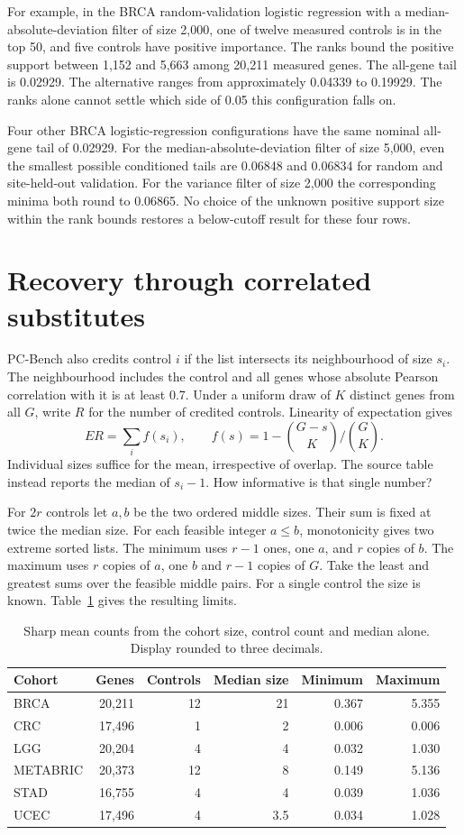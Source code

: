\documentclass[11pt]{article}
\begin{document}
For example, in the BRCA random-validation logistic regression with a median-absolute-deviation filter of size 2,000, one of twelve measured controls is in the top 50, and five controls have positive importance. The ranks bound the positive support between 1,152 and 5,663 among 20,211 measured genes. The all-gene tail is 0.02929. The alternative ranges from approximately 0.04339 to 0.19929. The ranks alone cannot settle which side of 0.05 this configuration falls on.

Four other BRCA logistic-regression configurations have the same nominal all-gene tail of 0.02929. For the median-absolute-deviation filter of size 5,000, even the smallest possible conditioned tails are 0.06848 and 0.06834 for random and site-held-out validation. For the variance filter of size 2,000 the corresponding minima both round to 0.06865. No choice of the unknown positive support size within the rank bounds restores a below-cutoff result for these four rows.

\newpage
\section{Recovery through correlated substitutes}
PC-Bench also credits control $i$ if the list intersects its neighbourhood of size $s_i$. The neighbourhood includes the control and all genes whose absolute Pearson correlation with it is at least 0.7. Under a uniform draw of $K$ distinct genes from all $G$, write $R$ for the number of credited controls. Linearity of expectation gives
\[
 E R=\sum_i f(s_i),\qquad f(s)=1-\binom{G-s}{K}/\binom{G}{K}.
\]
Individual sizes suffice for the mean, irrespective of overlap. The source table instead reports the median of $s_i-1$. How informative is that single number?

For $2r$ controls let $a,b$ be the two ordered middle sizes. Their sum is fixed at twice the median size. For each feasible integer $a\le b$, monotonicity gives two extreme sorted lists. The minimum uses $r-1$ ones, one $a$, and $r$ copies of $b$. The maximum uses $r$ copies of $a$, one $b$ and $r-1$ copies of $G$. Take the least and greatest sums over the feasible middle pairs. For a single control the size is known. Table~\ref{median} gives the resulting limits.
\begin{table}[h]\centering
\caption{Sharp mean counts from the cohort size, control count and median alone. Display rounded to three decimals.}\label{median}
\begin{tabular}{lrrrrr}\toprule
Cohort & Genes & Controls & Median size & Minimum & Maximum\\\midrule
BRCA &20,211&12&21&0.367&5.355\\
CRC &17,496&1&2&0.006&0.006\\
LGG &20,204&4&4&0.032&1.030\\
METABRIC &20,373&12&8&0.149&5.136\\
STAD &16,755&4&4&0.039&1.036\\
UCEC &17,496&4&3.5&0.034&1.028\\\bottomrule
\end{tabular}\end{table}
\end{document}
